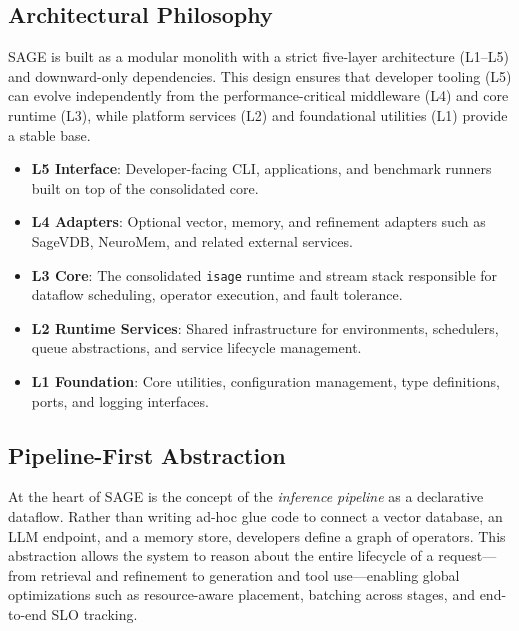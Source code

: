 \subsection{Architectural Philosophy}
SAGE is built as a modular monolith with a strict five-layer architecture (L1--L5) and downward-only
dependencies. This design ensures that developer tooling (L5) can evolve independently from the
performance-critical middleware (L4) and core runtime (L3), while platform services (L2) and foundational
utilities (L1) provide a stable base.

\begin{itemize}
  \item \textbf{L5 Interface}: Developer-facing CLI, applications, and benchmark runners built on top of the consolidated core.
  \item \textbf{L4 Adapters}: Optional vector, memory, and refinement adapters such as SageVDB, NeuroMem, and related external services.
  \item \textbf{L3 Core}: The consolidated \texttt{isage} runtime and stream stack responsible for dataflow scheduling,
        operator execution, and fault tolerance.
  \item \textbf{L2 Runtime Services}: Shared infrastructure for environments, schedulers, queue abstractions, and service lifecycle management.
  \item \textbf{L1 Foundation}: Core utilities, configuration management, type definitions, ports, and logging interfaces.
\end{itemize}

\subsection{Pipeline-First Abstraction}
At the heart of SAGE is the concept of the \emph{inference pipeline} as a declarative dataflow. Rather than
writing ad-hoc glue code to connect a vector database, an LLM endpoint, and a memory store, developers define
a graph of operators. This abstraction allows the system to reason about the entire lifecycle of a request---from retrieval and refinement to generation and tool use---enabling global optimizations such as
resource-aware placement, batching across stages, and end-to-end SLO tracking.

